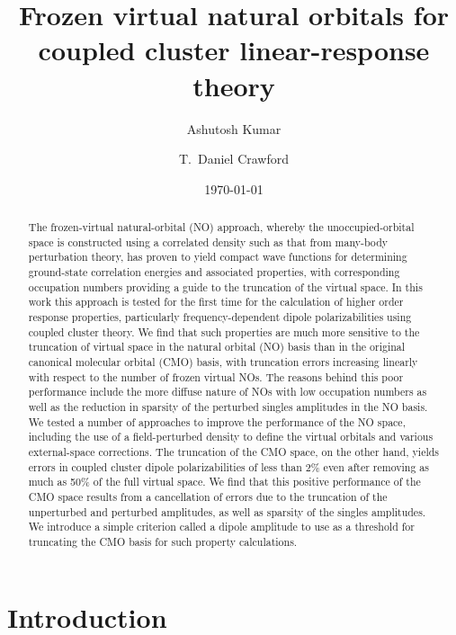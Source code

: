 \documentclass[11pt,article]{achemso}
\title{Frozen virtual natural orbitals for coupled cluster linear-response theory}
\author{Ashutosh Kumar}
\affiliation{Department of Chemistry, Virginia Tech, Blacksburg, Virginia 24061, U.S.A.}
\author{T.\ Daniel Crawford}
\affiliation{Department of Chemistry, Virginia Tech, Blacksburg, Virginia 24061, U.S.A.}
\date{\today}
\begin{document}
\begin{abstract} The frozen-virtual natural-orbital (NO) approach, whereby the
unoccupied-orbital space is constructed using a correlated density such as
that from many-body perturbation theory, has proven to yield compact wave
functions for determining ground-state correlation energies and associated
properties, with corresponding occupation numbers providing a guide to the
truncation of the virtual space.  In this work this approach is tested for the
first time for the calculation of higher order response properties,
particularly frequency-dependent dipole polarizabilities using coupled cluster
theory.  We find that such properties are much more sensitive to the
truncation of virtual space in the natural orbital (NO) basis than in the
original canonical molecular orbital (CMO) basis, with truncation errors
increasing linearly with respect to the number of frozen virtual NOs.  The
reasons behind this poor performance include the more diffuse nature of NOs
with low occupation numbers as well as the reduction in sparsity of the
perturbed singles amplitudes in the NO basis.  We tested a number of approaches
to improve the performance of the NO space, including the use of a
field-perturbed density to define the virtual orbitals and various
external-space corrections.  The truncation of the CMO space, on the other
hand, yields errors in coupled cluster dipole polarizabilities of less than
2\% even after removing as much as 50\% of the full virtual space. We find
that this positive performance of the CMO space results from a cancellation of
errors due to the truncation of the unperturbed and perturbed amplitudes, as
well as sparsity of the singles amplitudes.  We introduce a simple criterion
called a dipole amplitude to use as a threshold for truncating the CMO basis
for such property calculations.  \end{abstract}

\maketitle

\section{Introduction}
\end{document}
